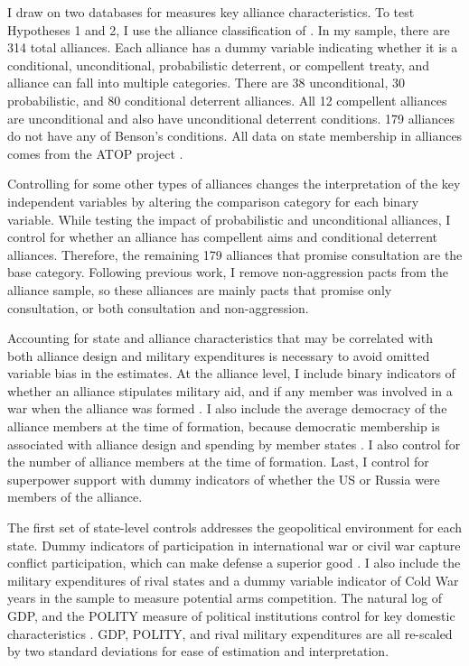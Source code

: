 \documentclass[12pt]{article}
\begin{document}
I draw on two databases for measures key alliance characteristics. To test Hypotheses 1 and 2, I use the alliance classification of \citet{Benson2012}. In my sample, there are 314 total alliances. Each alliance has a dummy variable indicating whether it is a conditional, unconditional, probabilistic deterrent, or compellent treaty, and alliance can fall into multiple categories. There are 38 unconditional, 30 probabilistic, and 80 conditional deterrent alliances. All 12 compellent alliances are unconditional and also have unconditional deterrent conditions. 179 alliances do not have any of Benson's conditions. All data on state membership in alliances comes from the ATOP project \citep{Leedsetal2002}. 

Controlling for some other types of alliances changes the interpretation of the key independent variables by altering the comparison category for each binary variable. While testing the impact of probabilistic and unconditional alliances, I control for whether an alliance has compellent aims and conditional deterrent alliances. Therefore, the remaining 179 alliances that promise consultation are the base category. Following previous work, I remove non-aggression pacts from the alliance sample, so these alliances are mainly pacts that promise only consultation, or both consultation and non-aggression. 

Accounting for state and alliance characteristics that may be correlated with both alliance design and military expenditures is necessary to avoid omitted variable bias in the estimates. At the alliance level, I include binary indicators of whether an alliance stipulates military aid, and if any member was involved in a war when the alliance was formed \citep{Leedsetal2002}. I also include the average democracy of the alliance members at the time of formation, because democratic membership is associated with alliance design \citep{Chibaetal2015} and spending by member states \citep{DigiuseppePoast2016}. I also control for the number of alliance members at the time of formation. Last, I control for superpower support with dummy indicators of whether the US or Russia were members of the alliance.  

The first set of state-level controls addresses the geopolitical environment for each state. Dummy indicators of participation in international war or civil war capture conflict participation, which can make defense a superior good \citep{OlsonZeckhauser1966}. I also include the military expenditures of rival states and a dummy variable indicator of Cold War years in the sample to measure potential arms competition. The natural log of GDP, and the POLITY measure of political institutions control for key domestic characteristics \citep{FordhamWalker2005}. GDP, POLITY, and rival military expenditures are all re-scaled by two standard deviations for ease of estimation and interpretation. 
\end{document}
